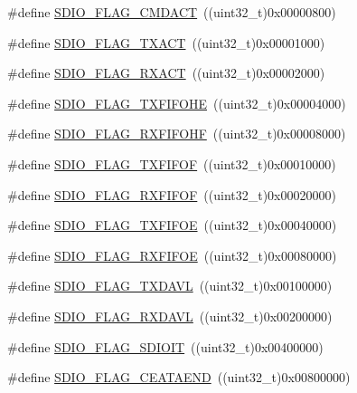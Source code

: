 \begin{DoxyCompactItemize}
\#define \hyperlink{group___s_d_i_o___flags_gad12a9b2bd30e7b907cbabfd92fc645b3}{S\+D\+I\+O\+\_\+\+F\+L\+A\+G\+\_\+\+C\+M\+D\+A\+CT}~((uint32\+\_\+t)0x00000800)
\item 
\#define \hyperlink{group___s_d_i_o___flags_gad5d075c98012586b169ec131aab2eeb5}{S\+D\+I\+O\+\_\+\+F\+L\+A\+G\+\_\+\+T\+X\+A\+CT}~((uint32\+\_\+t)0x00001000)
\item 
\#define \hyperlink{group___s_d_i_o___flags_gacc935dd830338970890a05922dff8ab7}{S\+D\+I\+O\+\_\+\+F\+L\+A\+G\+\_\+\+R\+X\+A\+CT}~((uint32\+\_\+t)0x00002000)
\item 
\#define \hyperlink{group___s_d_i_o___flags_gae9277461d3c8984dc31af318e2df1959}{S\+D\+I\+O\+\_\+\+F\+L\+A\+G\+\_\+\+T\+X\+F\+I\+F\+O\+HE}~((uint32\+\_\+t)0x00004000)
\item 
\#define \hyperlink{group___s_d_i_o___flags_ga8c5942ae3df21efad2d7c61a46015758}{S\+D\+I\+O\+\_\+\+F\+L\+A\+G\+\_\+\+R\+X\+F\+I\+F\+O\+HF}~((uint32\+\_\+t)0x00008000)
\item 
\#define \hyperlink{group___s_d_i_o___flags_gad3ca936300ef251639a4cfbe2f63b6b8}{S\+D\+I\+O\+\_\+\+F\+L\+A\+G\+\_\+\+T\+X\+F\+I\+F\+OF}~((uint32\+\_\+t)0x00010000)
\item 
\#define \hyperlink{group___s_d_i_o___flags_gaf92cb783f000b8d946fe8ace81b51df2}{S\+D\+I\+O\+\_\+\+F\+L\+A\+G\+\_\+\+R\+X\+F\+I\+F\+OF}~((uint32\+\_\+t)0x00020000)
\item 
\#define \hyperlink{group___s_d_i_o___flags_gac41ef05773abad79b4b0c443a77733db}{S\+D\+I\+O\+\_\+\+F\+L\+A\+G\+\_\+\+T\+X\+F\+I\+F\+OE}~((uint32\+\_\+t)0x00040000)
\item 
\#define \hyperlink{group___s_d_i_o___flags_ga59ea7e2dc22df742053c5e525b98599d}{S\+D\+I\+O\+\_\+\+F\+L\+A\+G\+\_\+\+R\+X\+F\+I\+F\+OE}~((uint32\+\_\+t)0x00080000)
\item 
\#define \hyperlink{group___s_d_i_o___flags_ga9c6620d6b16b6af19d3e14f40e688631}{S\+D\+I\+O\+\_\+\+F\+L\+A\+G\+\_\+\+T\+X\+D\+A\+VL}~((uint32\+\_\+t)0x00100000)
\item 
\#define \hyperlink{group___s_d_i_o___flags_ga7558b354658171bb6aa1b6f1e16d8e21}{S\+D\+I\+O\+\_\+\+F\+L\+A\+G\+\_\+\+R\+X\+D\+A\+VL}~((uint32\+\_\+t)0x00200000)
\item 
\#define \hyperlink{group___s_d_i_o___flags_gae888ec1c9885c35a5f8e01bcffe324a1}{S\+D\+I\+O\+\_\+\+F\+L\+A\+G\+\_\+\+S\+D\+I\+O\+IT}~((uint32\+\_\+t)0x00400000)
\item 
\#define \hyperlink{group___s_d_i_o___flags_ga3c8d09a405944948e7a1c5493d49aff1}{S\+D\+I\+O\+\_\+\+F\+L\+A\+G\+\_\+\+C\+E\+A\+T\+A\+E\+ND}~((uint32\+\_\+t)0x00800000)

\end{DoxyCompactItemize}
